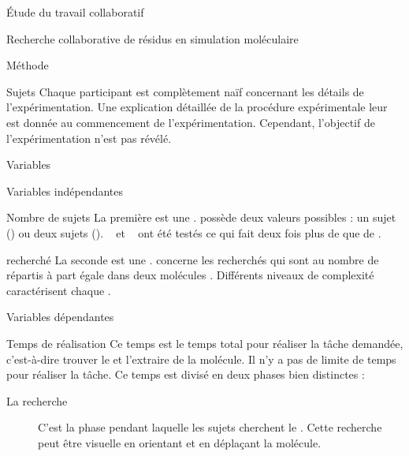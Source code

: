 \documentclass[myfrancais]{mythesis}
\begin{document}
\begin{mypart}{Étude du travail collaboratif}
\begin{mychapter}{Recherche collaborative de résidus en simulation moléculaire}
\begin{mysection}{Méthode}
\begin{mysubsection}{Sujets}
					Chaque participant est complètement naïf concernant les détails de l'expérimentation.
					Une explication détaillée de la procédure expérimentale leur est donnée au commencement de l'expérimentation.
					Cependant, l'objectif de l'expérimentation n'est pas révélé.
				\end{mysubsection}
				\begin{mysubsection}{Variables}
					\begin{mysubsubsection}{Variables indépendantes}
						\begin{myparagraph}{ Nombre de sujets}
							La première  est une .
							 possède deux valeurs possibles : \og un sujet \fg (\mycf {}) ou \og deux sujets \fg (\mycf {}).
							~ et ~ ont été testés ce qui fait deux fois plus de  que de .
						\end{myparagraph}
						\begin{myparagraph}{  recherché}
							La seconde  est une .
							 concerne les  recherchés qui sont au nombre de  répartis à part égale dans deux molécules .
							Différents niveaux de complexité caractérisent chaque  .
						\end{myparagraph}
					\end{mysubsubsection}
					\begin{mysubsubsection}{Variables dépendantes}
						\begin{myparagraph}{ Temps de réalisation}
							Ce temps est le temps total pour réaliser la tâche demandée, c'est-à-dire trouver le  et l'extraire de la molécule.
							Il n'y a pas de limite de temps pour réaliser la tâche.
							Ce temps est divisé en deux phases bien distinctes :
							\begin{description}
								\item[La recherche] C'est la phase pendant laquelle les sujets cherchent le .
									Cette recherche peut être visuelle en orientant et en déplaçant la molécule.

\end{description}
\end{myparagraph}
\end{mysubsubsection}
\end{mysubsection}
\end{mysection}
\end{mychapter}
\end{mypart}
\end{document}
